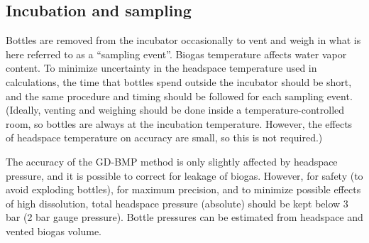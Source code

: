 \documentclass[]{article}
\begin{document}
\subsection{Incubation and sampling}
Bottles are removed from the incubator occasionally to vent and weigh in what is here referred to as a ``sampling event''. 
Biogas temperature affects water vapor content. 
To minimize uncertainty in the headspace temperature used in calculations, the time that bottles spend outside the incubator should be short, and the same procedure and timing should be followed for each sampling event. 
(Ideally, venting and weighing should be done inside a temperature-controlled room, so bottles are always at the incubation temperature. 
However, the effects of headspace temperature on accuracy are small, so this is not required.)

The accuracy of the GD-BMP method is only slightly affected by headspace pressure, and it is possible to correct for leakage of biogas. 
However, for safety (to avoid exploding bottles), for maximum precision, and to minimize possible effects of high  dissolution, total headspace pressure (absolute) should be kept below 3 bar (2 bar gauge pressure). 
Bottle pressures can be estimated from headspace and vented biogas volume.
\end{document}
